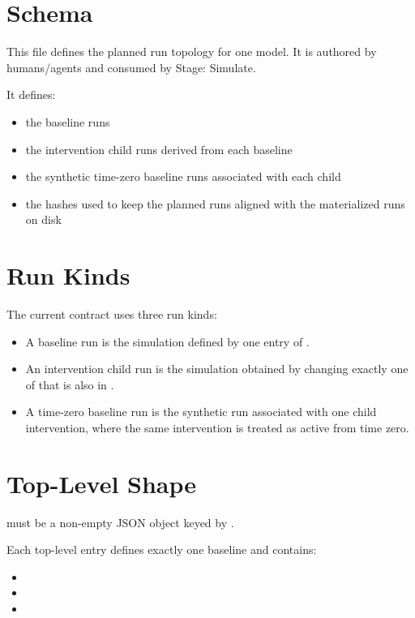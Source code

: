 \documentclass[11pt]{article}
\begin{document}
\label{docstart:model_run_specs_schema}

\section*{\texorpdfstring{}{model_run_specs.json} Schema}
\label{sec:model-run-specs-schema}

This file defines the planned run topology for one model.
It is authored by humans/agents and consumed by Stage: Simulate.

It defines:
\begin{itemize}
\item the baseline runs
\item the intervention child runs derived from each baseline
\item the synthetic time-zero baseline runs associated with each child
\item the hashes used to keep the planned runs aligned with the materialized runs on disk
\end{itemize}

\section*{Run Kinds}

The current contract uses three run kinds:

\begin{itemize}
\item A baseline run is the simulation defined by one entry of .
\item An intervention child run is the simulation obtained by changing exactly one of  that is also in .
\item A time-zero baseline run is the synthetic run associated with one child intervention, where the same intervention is treated as active from time zero.
\end{itemize}

\section*{Top-Level Shape}

 must be a non-empty JSON object keyed by .

Each top-level entry defines exactly one baseline and contains:
\begin{itemize}
\item {}
\item {}
\item {}
\end{itemize}
\end{document}
